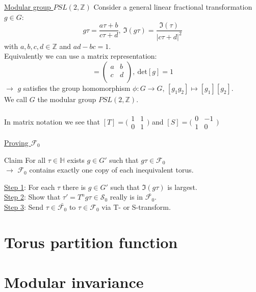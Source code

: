 \documentclass[11pt,aspectratio=169]{beamer}
\begin{document}
\begin{frame}{\underline{Modular group $PSL(2, \mathbb{Z})$}}
	Consider a general linear fractional transformation $g \in G$:
	\begin{equation}
		g\tau = \frac{a\tau + b}{c\tau + d},~\Im(g\tau) = \frac{\Im(\tau)}{|c\tau + d|^2}
	\end{equation}
	with $a, b, c, d \in \mathbb{Z}$ and $ad- bc = 1$.
	\\
	Equivalently we can use a matrix representation:
	\begin{equation}
		[g] = \begin{pmatrix}
			a & b \\
			c & d \\
		\end{pmatrix},~\textrm{det}[g] = 1
	\end{equation}
	$\rightarrow$ $g$ satisfies the group homomorphism $\phi : G \rightarrow G$, $[g_1 g_2] \mapsto [g_1][g_2]$.
	\\
	We call $G$ the modular group $PSL(2, \mathbb{Z})$.
	\\~\\
	In matrix notation we see that $[T] = \big(\begin{smallmatrix}
		1 & 1\\
		0 & 1
	  \end{smallmatrix}\big)$ and $[S] = \big(\begin{smallmatrix}
		0 & -1\\
		1 & 0
	  \end{smallmatrix}\big)$ 
\end{frame}

\begin{frame}{\underline{Proving $\mathcal{F}_0$}}
	\begin{block}{Claim}
		For all $\tau \in \mathbb{H}$ exists $g \in G'$ such that $g\tau \in \mathcal{F}_0$
		\\
		$\rightarrow$ $\mathcal{F}_0$ contains exactly one copy of each inequivalent torus.
	\end{block}
	\underline{Step 1}: For each $\tau$ there is $g \in G'$ such that $\Im(g\tau)$ is largest.
	\\
	\underline{Step 2}: Show that $\tau' = T^{n}g\tau \in \mathcal{S}_0$ really is in $\bar{\mathcal{F}_0}$.
	\\
	\underline{Step 3}: Send $\tau \in \bar{\mathcal{F}_0}$ to $\tau \in \mathcal{F}_0$ via T- or S-transform.
\end{frame}

\section{Torus partition function}



\section{Modular invariance}
\end{document}
